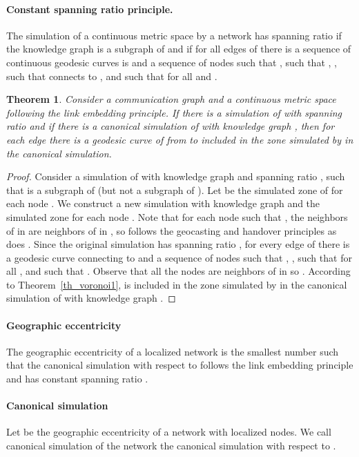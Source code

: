 \documentclass{article}
\newtheorem{theorem}{Theorem}
\begin{document}
\paragraph{Constant spanning ratio principle.} The simulation of a continuous metric space  by a network  has spanning ratio  if the knowledge graph  is a subgraph of  and if for all edges  of  there is a sequence  of continuous geodesic curves is  and a sequence  of nodes such that , such that , , such that  connects  to , and such that for all   and .

\newpage
\begin{theorem}
Consider a communication graph  and a continuous metric space  following the link embedding principle. If there is a simulation of  with spanning ratio  and if there is a canonical simulation of  with knowledge graph , then for each edge  there is a geodesic curve  of  from  to  included in the zone simulated by  in the canonical simulation.
\label{th_constant}
\end{theorem}
\begin{proof}
Consider a simulation of  with knowledge graph  and spanning ratio , such that  is a subgraph of  (but not a subgraph of ).
Let  be the simulated zone of  for each node . We construct a new simulation with knowledge graph  and the simulated zone  for each node . Note that for each node  such that , the neighbors of  in  are neighbors of  in , so  follows the geocasting and handover principles as does . Since the original simulation has spanning ratio , for every edge  of  there is a geodesic curve  connecting  to  and a sequence  of nodes such that , , such that for all  , and such that . Observe that all the nodes  are neighbors of  in  so . According to Theorem~\ref{th_voronoi1},  is included in the zone simulated by  in the canonical simulation of  with knowledge graph .
\end{proof}

\paragraph{Geographic eccentricity} The geographic eccentricity of a localized network is the smallest number  such that the canonical simulation with respect to  follows the link embedding principle and has constant spanning ratio .

\paragraph{Canonical simulation}
Let  be the geographic eccentricity of a network with localized nodes. We call canonical simulation of the network the canonical simulation with respect to .
\end{document}

